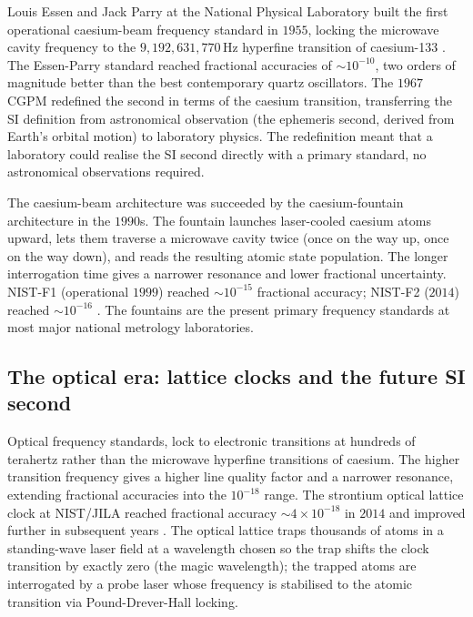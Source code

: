 Louis Essen and Jack Parry at the National Physical Laboratory
built the first operational caesium-beam frequency standard in
$1955$, locking the microwave cavity frequency to the $9{,}192
{,}631{,}770 \,\si{\hertz}$ hyperfine transition of caesium-133
\cite{paper:ch06t3-essen-parry-1955}. The Essen-Parry standard
reached fractional accuracies of $\sim 10^{-10}$, two orders of
magnitude better than the best contemporary quartz oscillators.
The $1967$ CGPM redefined the second in terms of the caesium
transition, transferring the SI definition from astronomical
observation (the ephemeris second, derived from Earth's orbital
motion) to laboratory physics. The redefinition meant that a
laboratory could realise the SI second directly with a primary
standard, no astronomical observations required.

The caesium-beam architecture was succeeded by the caesium-fountain
architecture in the $1990$s. The fountain launches laser-cooled
caesium atoms upward, lets them traverse a microwave cavity twice
(once on the way up, once on the way down), and reads the
resulting atomic state population. The longer interrogation time
gives a narrower resonance and lower fractional uncertainty.
NIST-F1 (operational $1999$) reached $\sim 10^{-15}$ fractional
accuracy; NIST-F2 ($2014$) reached $\sim 10^{-16}$
\cite{web:nist-cesium-fountain}. The fountains are the present
primary frequency standards at most major national metrology
laboratories.

\subsection{The optical era: lattice clocks and the future SI second}

Optical frequency standards, lock to electronic transitions at
hundreds of terahertz rather than the microwave hyperfine
transitions of caesium. The higher transition frequency gives a
higher line quality factor and a narrower resonance, extending
fractional accuracies into the $10^{-18}$ range. The strontium
optical lattice clock at NIST/JILA reached fractional accuracy
$\sim 4 \times 10^{-18}$ in $2014$ and improved further in
subsequent years \cite{web:ch06t3-nist-strontium-2024}. The
optical lattice traps thousands of atoms in a standing-wave laser
field at a wavelength chosen so the trap shifts the clock
transition by exactly zero (the magic wavelength); the trapped
atoms are interrogated by a probe laser whose frequency is
stabilised to the atomic transition via Pound-Drever-Hall
locking.

